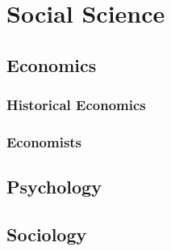 \chapter{Social Science}
	\section{Economics}
		\subsection{Historical Economics}
		\subsection{Economists}

	\section{Psychology}
	\section{Sociology}